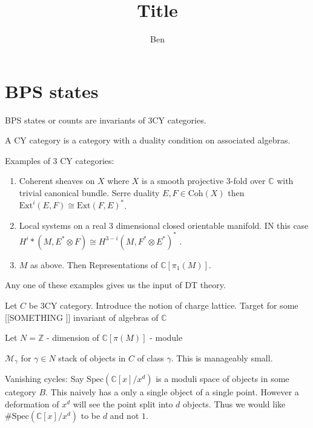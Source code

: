 % 



\title{Title}
\author{Ben}
\date{}

 
\maketitle

\section{BPS states} %

\begin{definition}
    BPS states or counts are invariants of 3CY categories. 
\end{definition}

A CY category is a category with a duality condition on associated algebras.

Examples of 3 CY categories:
\begin{enumerate}
    \item Coherent sheaves on $X$ where $X$ is a smooth projective 3-fold over $ \mathbb{C} $ 
        with trivial canonical bundle. 
        Serre duality $E, F \in \mathrm{Coh} (X) $ then $ \mathrm{Ext} ^i (E, F)  \cong \mathrm{Ext}  ( F, E) ^* $.
    \item Local systems on a real 3 dimensional closed orientable manifold. 
        IN this case $ H^i * (M, E^* \otimes F ) \cong H ^{3-i } ( M, F^* \otimes E^* ) ^* $ .
    \item $M$ as above. Then Representations of $ \mathbb{C} [ \pi_1 ( M) ] $. 
\end{enumerate}
Any one of these examples gives us the input of DT theory. 

Let $ C $ be 3CY category. 
Introduce the notion of charge lattice. 
Target for some [[SOMETHING ]]  invariant of algebras of $ \mathbb{C} $ 

Let $ N = \mathbb{Z}  $ - dimension of $ \mathbb{C} [ \pi ( M) ] $ - module 

$ \mathcal{M} _\gamma $ for $ \gamma \in N $ stack of objects  in $ C $ of class $ \gamma $. 
This is manageably small. 

Vanishing cycles: Say $\mathrm{Spec} ( \mathbb{C} [x]/ x^d ) $ is a moduli space of objects in some category $B$. 
This naively has a only a single object of a single point. 
However a deformation of $x^d $ will see the point split into $d$ objects. 
Thus we would like $ \# \mathrm{Spec} ( \mathbb{C} [x]/ x^d ) $ to be $ d$ and not $1$. 

